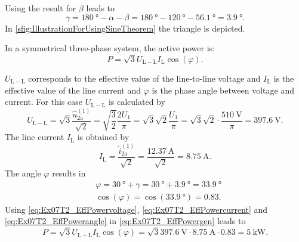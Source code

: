 \begin{solutionblock}
    Using the result for $\beta$ leads to
    \begin{equation}
        \gamma=\SI{180}{\degree}-\alpha-\beta = \SI{180}{\degree}-\SI{120}{\degree}-\SI{56.1}{\degree}= \SI{3.9}{\degree}.
    \end{equation}
    In \autoref{sfig:IllustrationForUsingSineTheorem} the triangle is depicted.
    
    In a symmetrical three-phase system, the active power is:
    \begin{equation}
        P=\sqrt{3} U_{\mathrm{L-L}} I_{\mathrm{L}} \cos(\varphi).
        \label{eq:Ex07T2_EffPowergen}
    \end{equation}

    $U_{\mathrm{L-L}}$ corresponds to the effective value of the line-to-line voltage and $I_{\mathrm{L}}$ is the effective value
    of the line current and $\varphi$ is the phase angle between voltage and current. For this case $U_{\mathrm{L-L}}$ is calculated by
    \begin{equation}
        U_{\mathrm{L-L}}=\sqrt{3}\frac{\hat{u}_\mathrm{2a}^\mathrm{(1)}}{\sqrt{2}}
        = \sqrt{\frac{3}{2}} \frac{2U_\mathrm{1}}{\pi} = \sqrt{3}\sqrt{2}\frac{U_\mathrm{1}}{\pi}
        = \sqrt{3}\sqrt{2} \cdot \frac{\SI{510}{\volt}}{\pi}=\SI{397.6}{\volt}.
        \label{eq:Ex07T2_EffPowervoltage}
    \end{equation}
    The line current $I_{\mathrm{L}}$ is obtained by
    \begin{equation}
        I_{\mathrm{L}}=\frac{\hat{i}_\mathrm{2a}^\mathrm{(1)}}{\sqrt{2}}
        = \frac{\SI{12.37}{\ampere}}{\sqrt{2}}=\SI{8.75}{\ampere}.
        \label{eq:Ex07T2_EffPowercurrent}
    \end{equation}    
    The angle $\varphi$ results in
    \begin{equation}
        \begin{split}        
            &\varphi=\SI{30}{\degree}+ \gamma= \SI{30}{\degree}+\SI{3.9}{\degree}= \SI{33.9}{\degree} \\
            &\cos(\varphi)=\cos(\SI{33.9}{\degree})=0.83.
        \end{split}          
        \label{eq:Ex07T2_EffPowerangle}
    \end{equation}
    Using \eqref{eq:Ex07T2_EffPowervoltage},  \eqref{eq:Ex07T2_EffPowercurrent} and  \eqref{eq:Ex07T2_EffPowerangle}
    in \eqref{eq:Ex07T2_EffPowergen} leads to
    \begin{equation}
        P=\sqrt{3} U_{\mathrm{L-L}} I_{\mathrm{L}} \cos(\varphi)
        = \sqrt{3} \SI{397.6}{\volt} \cdot \SI{8.75}{\ampere} \cdot 0.83= \SI{5}{\kilo\watt}.
    \end{equation}
\end{solutionblock}